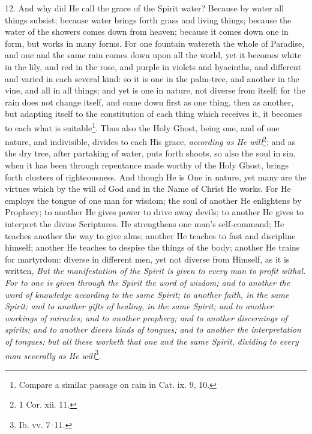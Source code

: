 12. And why did He call the grace of the Spirit water? Because by water all things subsist; because water brings forth grass and living things; because the water of the showers comes down from heaven; because it comes down one in form, but works in many forms. For one fountain watereth the whole of Paradise, and one and the same rain comes down upon all the world, yet it becomes white in the lily, and red in the rose, and purple in violets and hyacinths, and different and varied in each several kind: so it is one in the palm-tree, and another in the vine, and all in all things; and yet is one in nature, not diverse from itself; for the rain does not change itself, and come down first as one thing, then as another, but adapting itself to the constitution of each thing which receives it, it becomes to each what is suitable\footnote{Compare a similar passage on rain in Cat. ix. 9, 10.}. Thus also the Holy Ghost, being one, and of one nature, and indivisible, divides to each His grace, \emph{according as He will}\footnote{1 Cor. xii. 11.}: and as the dry tree, after partaking of water, puts forth shoots, so also the soul in sin, when it has been through repentance made worthy of the Holy Ghost, brings forth clusters of righteousness. And though He is One in nature, yet many are the virtues which by the will of God and in the Name of Christ He works. For He employs the tongue of one man for wisdom; the soul of another He enlightens by Prophecy; to another He gives power to drive away devils; to another He gives to interpret the divine Scriptures. He strengthens one man’s self-command; He teaches another the way to give alms; another He teaches to fast and discipline himself; another He teaches to despise the things of the body; another He trains for martyrdom: diverse in different men, yet not diverse from Himself, as it is written, \emph{But the manifestation of the Spirit is given to every man to profit withal. For to one is given through the Spirit the word of wisdom; and to another the word of knowledge according to the same Spirit; to another faith, in the same Spirit; and to another gifts of healing, in the same Spirit; and to another workings of miracles; and to another prophecy; and to another discernings of spirits; and to another divers kinds of tongues; and to another the interpretation of tongues: but all these worketh that one and the same Spirit, dividing to every man severally as He will}\footnote{Ib. vv. 7–11.}.

